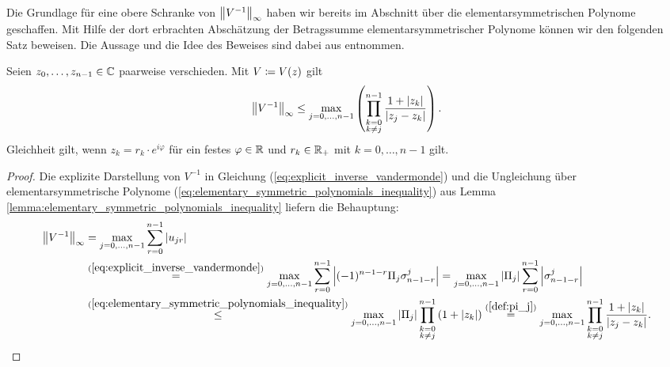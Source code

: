 Die Grundlage für eine obere Schranke von $\left\lVert V^{-1} \right\rVert_\infty$
haben wir bereits im Abschnitt über die elementarsymmetrischen Polynome geschaffen.
Mit Hilfe der dort erbrachten Abschätzung der Betragssumme
elementarsymmetrischer Polynome können wir den folgenden Satz beweisen.
Die Aussage und die Idee des Beweises sind dabei aus\linebreak
\cite[S. 196-197]{gautschi1} entnommen.
\begin{theorem}
  \label{thm:inverse_vandermonde_upper_bound}
  Seien $z_0, \dots, z_{n-1} \in \mathbb{C}$ paarweise verschieden.
  Mit $V \coloneqq V \! \left( z \right)$ gilt
  \begin{equation}
    \label{eq:inverse_vandermonde_upper_bound}
    \left\lVert V^{-1} \right\rVert_{\infty}
    \leq \max_{j = 0, \dots, n-1} \left( \prod_{\substack{k = 0\\ k \neq j}}^{n-1} \frac{1 + \left\lvert z_k \right\rvert}{\left\lvert z_j - z_k \right\rvert} \right).
  \end{equation}
  Gleichheit gilt, wenn $z_k = r_k \cdot e^{i \varphi}$
  für ein festes $\varphi \in \mathbb{R}$ und $r_k \in \mathbb{R}_{+}$ mit $k = 0, \dots, n-1$ gilt.
\end{theorem}
\begin{proof}
    Die explizite Darstellung von $V^{-1}$ in Gleichung
    (\ref{eq:explicit_inverse_vandermonde}) und die Ungleichung
    über elementarsymmetrische Polynome
    (\ref{eq:elementary_symmetric_polynomials_inequality})
    aus Lemma \ref{lemma:elementary_symmetric_polynomials_inequality}
    liefern die Behauptung:
    \begin{equation*}
        \begin{split}
            \left\lVert V^{-1} \right\rVert_{\infty}
            &= \max_{j=0, \dots, n-1} \sum_{r=0}^{n-1} \left\lvert u_{jr} \right\rvert\\
            &\overset{(\ref{eq:explicit_inverse_vandermonde})}{=}
              \max_{j=0, \dots, n-1} \sum_{r=0}^{n-1} \left\lvert (-1)^{n-1-r} \Pi_j \sigma_{n-1-r}^{j} \right\rvert
            = \max_{j=0, \dots, n-1} \left\lvert \Pi_j \right\rvert \sum_{r=0}^{n-1} \left\lvert \sigma_{n-1-r}^{j} \right\rvert\\
            &\overset{(\ref{eq:elementary_symmetric_polynomials_inequality})}{\leq}
              \max_{j=0, \dots, n-1} \left\lvert \Pi_j \right\rvert \prod_{\substack{k=0\\ k \neq j}}^{n-1} \left( 1 + \left\lvert z_k \right\rvert \right)
            \overset{(\ref{def:pi_j})}{=}
              \max_{j=0, \dots, n-1} \prod_{\substack{k=0\\ k \neq j}}^{n-1} \frac{1 + \left\lvert z_k \right\rvert}{\left\lvert z_j - z_k \right\rvert}.
        \end{split}
    \end{equation*}
\end{proof}

